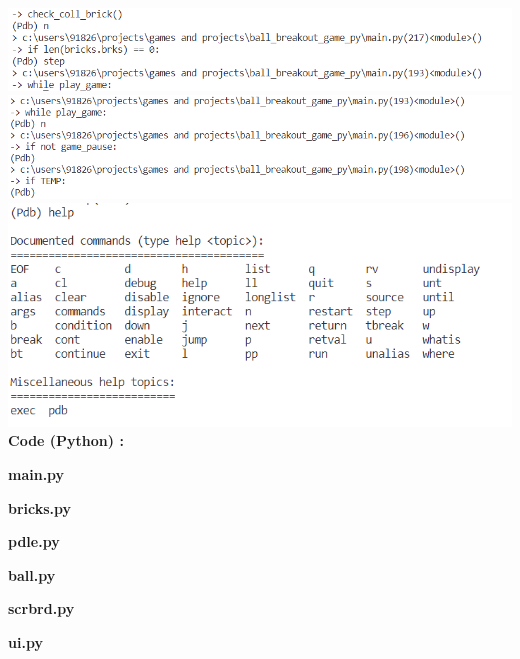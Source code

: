 \documentclass{article}
\begin{document}
\includegraphics[scale=0.70]{main_pdb_06}\\
\includegraphics[scale=0.70]{main_pdb_07}\\
\includegraphics[scale=0.70]{main_pdb_08}\\

\textbf{\bf Code (Python) : \\}

\textbf{\bf main.py}

\textbf{\bf bricks.py}

\textbf{\bf pdle.py}

\textbf{\bf ball.py}

\textbf{\bf scrbrd.py}

\textbf{\bf ui.py}

\end{document}
